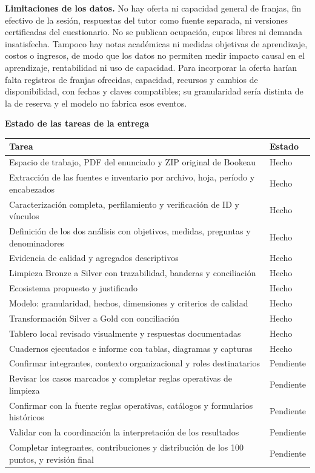 \documentclass[11pt,letterpaper]{article}
\begin{document}
\textbf{Limitaciones de los datos.} No hay oferta ni capacidad general de franjas, fin efectivo de la sesión, respuestas del tutor como fuente separada, ni versiones certificadas del cuestionario. No se publican ocupación, cupos libres ni demanda insatisfecha. Tampoco hay notas académicas ni medidas objetivas de aprendizaje, costos o ingresos, de modo que los datos no permiten medir impacto causal en el aprendizaje, rentabilidad ni uso de capacidad. Para incorporar la oferta harían falta registros de franjas ofrecidas, capacidad, recursos y cambios de disponibilidad, con fechas y claves compatibles; su granularidad sería distinta de la de reserva y el modelo no fabrica esos eventos.

\textbf{Estado de las tareas de la entrega}

\begingroup\small\setlength{\tabcolsep}{4pt}\renewcommand{\arraystretch}{1.15}
\begin{longtable}{>{\raggedright\arraybackslash}p{}>{\raggedright\arraybackslash}p{}}
\toprule
\textbf{Tarea} & \textbf{Estado} \\
\midrule
\endhead
Espacio de trabajo, PDF del enunciado y ZIP original de Bookeau & Hecho \\
Extracción de las fuentes e inventario por archivo, hoja, período y encabezados & Hecho \\
Caracterización completa, perfilamiento y verificación de ID y vínculos & Hecho \\
Definición de los dos análisis con objetivos, medidas, preguntas y denominadores & Hecho \\
Evidencia de calidad y agregados descriptivos & Hecho \\
Limpieza Bronze a Silver con trazabilidad, banderas y conciliación & Hecho \\
Ecosistema propuesto y justificado & Hecho \\
Modelo: granularidad, hechos, dimensiones y criterios de calidad & Hecho \\
Transformación Silver a Gold con conciliación & Hecho \\
Tablero local revisado visualmente y respuestas documentadas & Hecho \\
Cuadernos ejecutados e informe con tablas, diagramas y capturas & Hecho \\
Confirmar integrantes, contexto organizacional y roles destinatarios & Pendiente \\
Revisar los casos marcados y completar reglas operativas de limpieza & Pendiente \\
Confirmar con la fuente reglas operativas, catálogos y formularios históricos & Pendiente \\
Validar con la coordinación la interpretación de los resultados & Pendiente \\
Completar integrantes, contribuciones y distribución de los 100 puntos, y revisión final & Pendiente \\
\bottomrule
\end{longtable}
\endgroup
\end{document}
